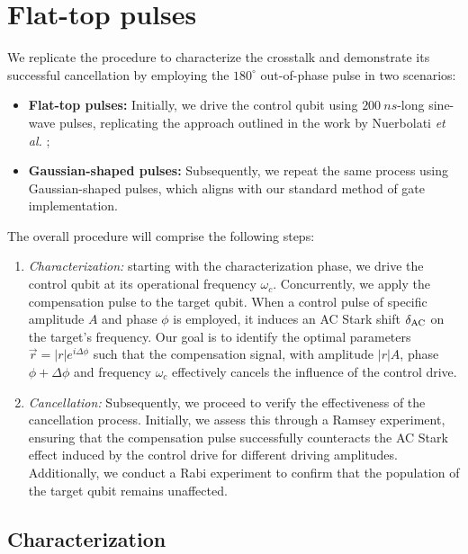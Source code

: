 \section{Flat-top pulses}

We replicate the procedure to characterize the crosstalk and demonstrate its successful cancellation by employing the $180^\circ$ out-of-phase pulse in two scenarios:
\begin{itemize}[itemsep=3pt]
    \item \textbf{Flat-top pulses:} Initially, we drive the control qubit using $\SI{200}{ns}$-long sine-wave pulses, replicating the approach outlined in the work by Nuerbolati \emph{et al.} \cite{crosstalk};
    \item \textbf{Gaussian-shaped pulses:} Subsequently, we repeat the same process using Gaussian-shaped pulses, which aligns with our standard method of gate implementation.
\end{itemize}

The overall procedure will comprise the following steps:
\begin{enumerate}
    \item \textit{Characterization:} starting with the characterization phase, we drive the control qubit at its operational frequency $\omega_c$.
    Concurrently, we apply the compensation pulse to the target qubit. 
    When a control pulse of specific amplitude $A$ and phase $\phi$ is employed, it induces an AC Stark shift $\delta_{\text{AC}}$ on the target's frequency.
    Our goal is to identify the optimal parameters $\Vec{r} = |r| e^{i\Delta \phi}$ such that the compensation signal, with amplitude $|r|A$, phase $\phi + \Delta \phi$ and frequency $\omega_c$ effectively cancels the influence of the control drive.
    \item \textit{Cancellation:} Subsequently, we proceed to verify the effectiveness of the cancellation process. 
    Initially, we assess this through a Ramsey experiment, ensuring that the compensation pulse successfully counteracts the AC Stark effect induced by the control drive for different driving amplitudes.
    Additionally, we conduct a Rabi experiment to confirm that the population of the target qubit remains unaffected.
\end{enumerate}

\subsection{Characterization}

